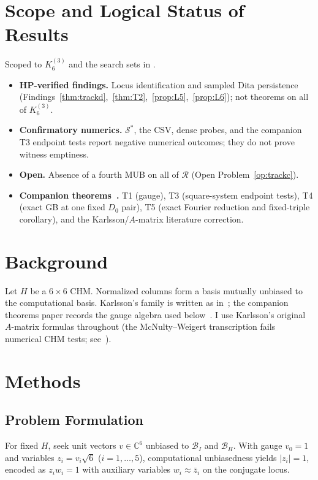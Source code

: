 \documentclass[onecolumn]{IEEEtran}
\begin{document}
\section{Scope and Logical Status of Results}
\label{sec:scope}

Scoped to $K_6^{(3)}$ and the search sets in .
\begin{itemize}
    \item \textbf{HP-verified findings.} Locus identification and sampled Dita persistence (Findings~\ref{thm:trackd},~\ref{thm:T2},~\ref{prop:L5},~\ref{prop:L6}); not theorems on all of $K_6^{(3)}$.
    \item \textbf{Confirmatory numerics.} $\mathcal{S}^*$, the CSV, dense probes, and the companion T3 endpoint tests report negative numerical outcomes; they do not prove witness emptiness.
    \item \textbf{Open.} Absence of a fourth MUB on all of $\mathcal{R}$ (Open Problem~\ref{op:trackc}).
    \item \textbf{Companion theorems~\cite{JaupiTheorems2026}.} T1 (gauge), T3 (square-system endpoint tests), T4 (exact GB at one fixed $D_0$ pair), T5 (exact Fourier reduction and fixed-triple corollary), and the Karlsson/$A$-matrix literature correction.
\end{itemize}

\section{Background}
\label{sec:background}

Let $H$ be a $6\times6$ CHM. Normalized columns form a basis mutually unbiased to the computational basis.
Karlsson's family is written as in~\cite{Karlsson2011, McNulty2026}; the companion theorems paper records the gauge algebra used below~\cite{JaupiTheorems2026}.
I use Karlsson's original $A$-matrix formulas throughout (the McNulty--Weigert transcription fails numerical CHM tests; see~\cite{JaupiTheorems2026}).

\section{Methods}
\label{sec:methods}

\subsection{Problem Formulation}
For fixed $H$, seek unit vectors $v\in\mathbb{C}^6$ unbiased to $\mathcal{B}_I$ and $\mathcal{B}_H$.
With gauge $v_0=1$ and variables $z_i=v_i\sqrt{6}$ ($i=1,\ldots,5$), computational unbiasedness yields $|z_i|=1$, encoded as $z_i w_i=1$ with auxiliary variables $w_i\approx\bar z_i$ on the conjugate locus.
\end{document}
